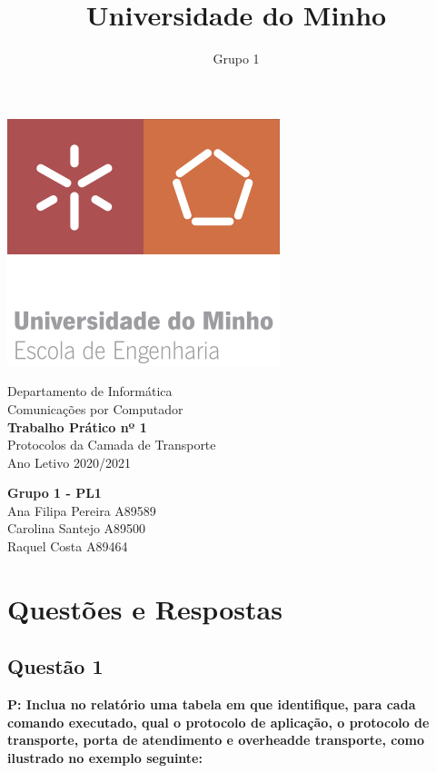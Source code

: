 \documentclass[a4paper]{article}
\title{Universidade do Minho}
\author{Grupo 1}
\date{}
\begin{document}
\begin{center}
	\includegraphics[scale=0.5]{images/um}
\end{center}


\begin{center}
	\vspace{14ex}
	\LARGE
	Departamento de Informática\\	
	\Huge
	Comunicações por Computador\\
	\vspace{7ex}
	\textbf{{
			\LARGE Trabalho Prático nº 1
	}}\\
	\vspace{5ex}
	{\large 
		Protocolos da Camada de Transporte\\
		Ano Letivo 2020/2021
	}
	\vspace{6ex}
\end{center}



\textbf{Grupo 1 - PL1}\\

Ana Filipa Pereira		A89589\\
Carolina Santejo		A89500  \\
Raquel Costa			A89464 \\




\newpage

\tableofcontents

\newpage


\section{Questões e Respostas}

	\subsection{ Questão 1} 
\textbf{P: Inclua no relatório uma tabela em que identifique, para cada comando executado, qual o protocolo de aplicação, o protocolo de transporte, porta de atendimento e overheadde transporte, como ilustrado no exemplo seguinte:\\}
\end{document}
